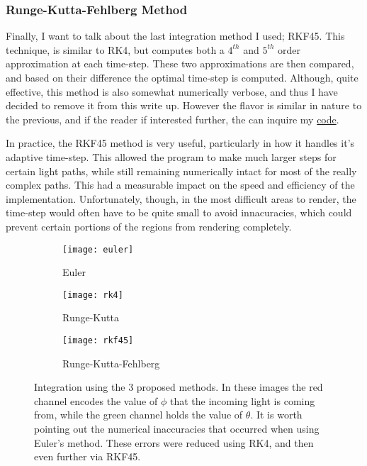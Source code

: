 \documentclass{article}
\begin{document}
\subsubsection{Runge-Kutta-Fehlberg Method}
Finally, I want to talk about the last integration method I used; RKF45. This technique, is similar to RK4, but computes both a $4^{th}$ and $5^{th}$ order approximation at each time-step. These two approximations are then compared, and based on their difference the optimal time-step is computed. Although, quite effective, this method is also somewhat numerically verbose, and thus I have decided to remove it from this write up. However the flavor is similar in nature to the previous, and if the reader if interested further, the can inquire my \color{red}\href{https://github.com/Varcho/GeneralRelativity}{code}\color{black}. \par
In practice, the RKF45 method is very useful, particularly in how it handles it's adaptive time-step. This allowed the program to make much larger steps for certain light paths, while still remaining numerically intact for most of the really complex paths. This had a measurable impact on the speed and efficiency of the implementation. Unfortunately, though, in the most difficult areas to render, the time-step would often have to be quite small to avoid innacuracies, which could prevent certain portions of the regions from rendering completely.
\begin{figure}[H]
\begin{subfigure}{.333\textwidth}
  \centering
  \texttt{[image: euler]}
  \caption{Euler}
  \label{fig:sfig1}
\end{subfigure}%
\begin{subfigure}{.333\textwidth}
  \centering
  \texttt{[image: rk4]}
  \caption{Runge-Kutta}
  \label{fig:sfig2}
\end{subfigure}%
\begin{subfigure}{.333\textwidth}
  \centering
  \texttt{[image: rkf45]}
  \caption{Runge-Kutta-Fehlberg}
  \label{fig:sfig3}
\end{subfigure}
\label{edge:vertex:face}
\caption{Integration using the 3 proposed methods. In these images the red channel encodes the value of $\phi$ that the incoming light is coming from, while the green channel holds the value of $\theta$. It is worth pointing out the numerical inaccuracies that occurred when using Euler's method. These errors were reduced using RK4, and then even further via RKF45.}
\end{figure}
\end{document}
